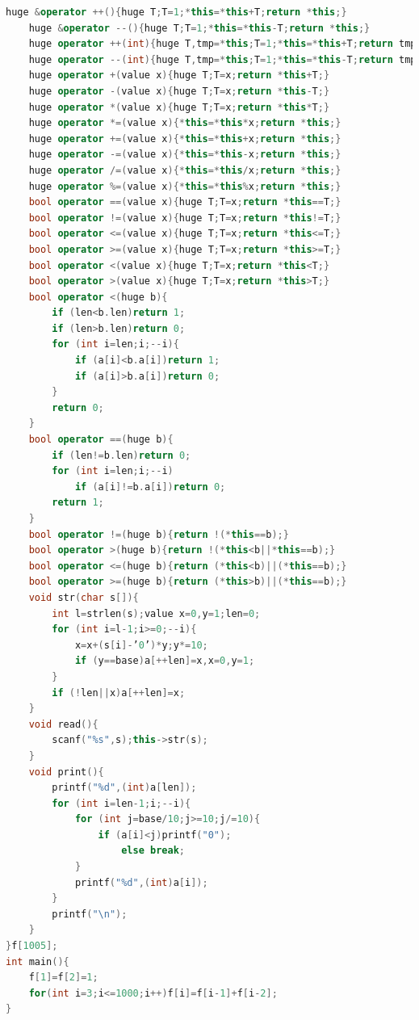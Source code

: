 \documentclass{article}
\begin{document}
\begin{lstlisting}[language=C++]
	huge &operator ++(){huge T;T=1;*this=*this+T;return *this;}
	huge &operator --(){huge T;T=1;*this=*this-T;return *this;}
	huge operator ++(int){huge T,tmp=*this;T=1;*this=*this+T;return tmp;}
	huge operator --(int){huge T,tmp=*this;T=1;*this=*this-T;return tmp;}
	huge operator +(value x){huge T;T=x;return *this+T;}
	huge operator -(value x){huge T;T=x;return *this-T;}
	huge operator *(value x){huge T;T=x;return *this*T;}
	huge operator *=(value x){*this=*this*x;return *this;}
	huge operator +=(value x){*this=*this+x;return *this;}
	huge operator -=(value x){*this=*this-x;return *this;}
	huge operator /=(value x){*this=*this/x;return *this;}
	huge operator %=(value x){*this=*this%x;return *this;}
	bool operator ==(value x){huge T;T=x;return *this==T;}
	bool operator !=(value x){huge T;T=x;return *this!=T;}
	bool operator <=(value x){huge T;T=x;return *this<=T;}
	bool operator >=(value x){huge T;T=x;return *this>=T;}
	bool operator <(value x){huge T;T=x;return *this<T;}
	bool operator >(value x){huge T;T=x;return *this>T;}
	bool operator <(huge b){
		if (len<b.len)return 1;
		if (len>b.len)return 0;
		for (int i=len;i;--i){
			if (a[i]<b.a[i])return 1;
			if (a[i]>b.a[i])return 0;
		}
		return 0;
	}
	bool operator ==(huge b){
		if (len!=b.len)return 0;
		for (int i=len;i;--i)
			if (a[i]!=b.a[i])return 0;
		return 1;
	}
	bool operator !=(huge b){return !(*this==b);}
	bool operator >(huge b){return !(*this<b||*this==b);}
	bool operator <=(huge b){return (*this<b)||(*this==b);}
	bool operator >=(huge b){return (*this>b)||(*this==b);}
	void str(char s[]){
		int l=strlen(s);value x=0,y=1;len=0;
		for (int i=l-1;i>=0;--i){
			x=x+(s[i]-’0’)*y;y*=10;
			if (y==base)a[++len]=x,x=0,y=1;
		}
		if (!len||x)a[++len]=x;
	}
	void read(){
		scanf("%s",s);this->str(s);
	}
	void print(){
		printf("%d",(int)a[len]);
		for (int i=len-1;i;--i){
			for (int j=base/10;j>=10;j/=10){
				if (a[i]<j)printf("0");
					else break;
			}
			printf("%d",(int)a[i]);
		}
		printf("\n");
	}
}f[1005];
int main(){
	f[1]=f[2]=1;
	for(int i=3;i<=1000;i++)f[i]=f[i-1]+f[i-2];
}
\end{lstlisting}
\end{document}
